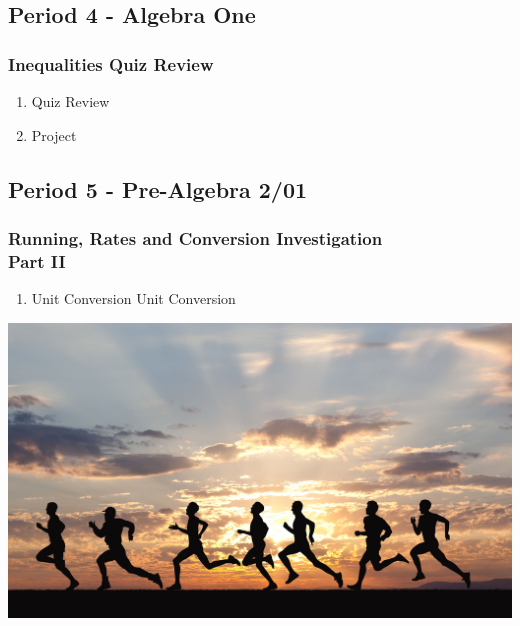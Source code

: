  \subsection[ALG]{Period 4 - Algebra One}
 \begin{frame}[label=ALG1]
 	\frametitle{Inequalities Quiz Review}

        \begin{enumerate}
   	   	   \item Quiz Review 
   	   	   \item {} Project 
   	     \end{enumerate}  	
  	
 	 	\end{frame}	 
 	
 	
 \subsection[PA2/01]{Period 5 - Pre-Algebra 2/01}
   \begin{frame}[label=PA2_01]
 	\frametitle{Running, Rates and Conversion Investigation \\ Part II}
 	
        \begin{enumerate}
   	   	   \item Unit Conversion  
   	   	   \rightarrowitem Unit Conversion  
   	     \end{enumerate} 	
   	\vspace{-12pt}
   	\begin{center}
   		\includegraphics[width=0.7\linewidth]{Images/running}
   	\end{center}      
   	\vspace{-20pt} 	
 	\end{frame}	 
      

